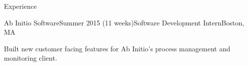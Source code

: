 \documentclass{resume}
\begin{document}
\begin{rSection}{Experience}
    \begin{rSubsection}{Ab Initio Software}{Summer 2015 (11 weeks)}{Software Development Intern}{Boston, MA}
    \item Built new customer facing features for Ab Initio's process management and monitoring client.
    \end{rSubsection}


  \end{rSection}
\end{document}
